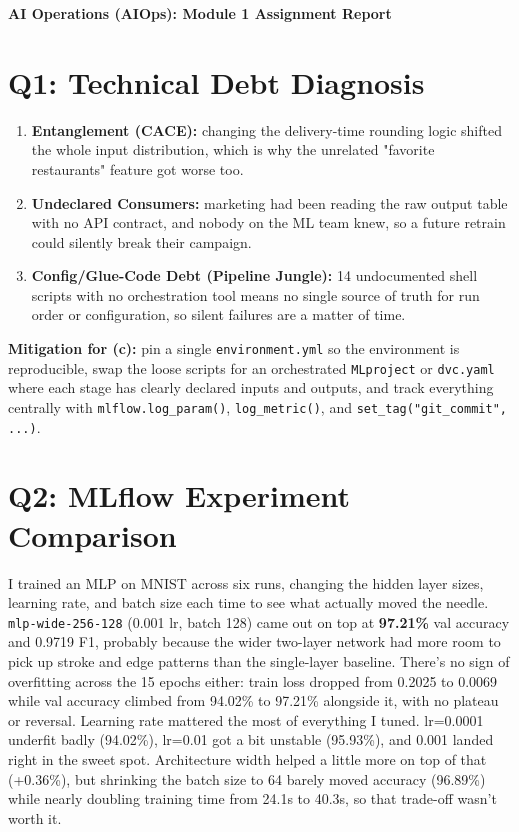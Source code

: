 \documentclass[10pt,a4paper]{article}
\begin{document}
{\centering \textbf{\large AI Operations (AIOps): Module 1 Assignment Report}\par}
\vspace{4pt}

\section*{Q1: Technical Debt Diagnosis}
\begin{enumerate}[label=(\alph*)]
    \item \textbf{Entanglement (CACE):} changing the delivery-time rounding logic shifted the whole input distribution, which is why the unrelated "favorite restaurants" feature got worse too.
    \item \textbf{Undeclared Consumers:} marketing had been reading the raw output table with no API contract, and nobody on the ML team knew, so a future retrain could silently break their campaign.
    \item \textbf{Config/Glue-Code Debt (Pipeline Jungle):} 14 undocumented shell scripts with no orchestration tool means no single source of truth for run order or configuration, so silent failures are a matter of time.
\end{enumerate}
\textbf{Mitigation for (c):} pin a single \texttt{environment.yml} so the environment is reproducible, swap the loose scripts for an orchestrated \texttt{MLproject} or \texttt{dvc.yaml} where each stage has clearly declared inputs and outputs, and track everything centrally with \texttt{mlflow.log\_param()}, \texttt{log\_metric()}, and \texttt{set\_tag("git\_commit", ...)}.

\section*{Q2: MLflow Experiment Comparison}
I trained an MLP on MNIST across six runs, changing the hidden layer sizes, learning rate, and batch size each time to see what actually moved the needle. \texttt{mlp-wide-256-128} (0.001 lr, batch 128) came out on top at \textbf{97.21\%} val accuracy and 0.9719 F1, probably because the wider two-layer network had more room to pick up stroke and edge patterns than the single-layer baseline. There's no sign of overfitting across the 15 epochs either: train loss dropped from 0.2025 to 0.0069 while val accuracy climbed from 94.02\% to 97.21\% alongside it, with no plateau or reversal. Learning rate mattered the most of everything I tuned. lr=0.0001 underfit badly (94.02\%), lr=0.01 got a bit unstable (95.93\%), and 0.001 landed right in the sweet spot. Architecture width helped a little more on top of that (+0.36\%), but shrinking the batch size to 64 barely moved accuracy (96.89\%) while nearly doubling training time from 24.1s to 40.3s, so that trade-off wasn't worth it.
\end{document}
